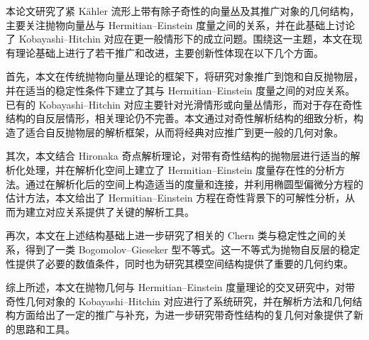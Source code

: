 
\begin{innovations}

本论文研究了紧 Kähler 流形上带有除子奇性的向量丛及其推广对象的几何结构，主要关注抛物向量丛与 Hermitian--Einstein 度量之间的关系，并在此基础上讨论了 Kobayashi--Hitchin 对应在更一般情形下的成立问题。围绕这一主题，本文在现有理论基础上进行了若干推广和改进，主要创新性体现在以下几个方面。

首先，本文在传统抛物向量丛理论的框架下，将研究对象推广到饱和自反抛物层，并在适当的稳定性条件下建立了其与 Hermitian--Einstein 度量之间的对应关系。已有的 Kobayashi--Hitchin 对应主要针对光滑情形或向量丛情形，而对于存在奇性结构的自反层情形，相关理论仍不完善。本文通过对奇性解析结构的细致分析，构造了适合自反抛物层的解析框架，从而将经典对应推广到更一般的几何对象。

其次，本文结合 Hironaka 奇点解析理论，对带有奇性结构的抛物层进行适当的解析化处理，并在解析化空间上建立了 Hermitian--Einstein 度量存在性的分析方法。通过在解析化后的空间上构造适当的度量和连接，并利用椭圆型偏微分方程的估计方法，本文给出了 Hermitian--Einstein 方程在奇性背景下的可解性分析，从而为建立对应关系提供了关键的解析工具。

再次，本文在上述结构基础上进一步研究了相关的 Chern 类与稳定性之间的关系，得到了一类 Bogomolov--Gieseker 型不等式。这一不等式为抛物自反层的稳定性提供了必要的数值条件，同时也为研究其模空间结构提供了重要的几何约束。

综上所述，本文在抛物几何与 Hermitian--Einstein 度量理论的交叉研究中，对带奇性几何对象的 Kobayashi--Hitchin 对应进行了系统研究，并在解析方法和几何结构方面给出了一定的推广与补充，为进一步研究带奇性结构的复几何对象提供了新的思路和工具。


\end{innovations}


%
%
%
